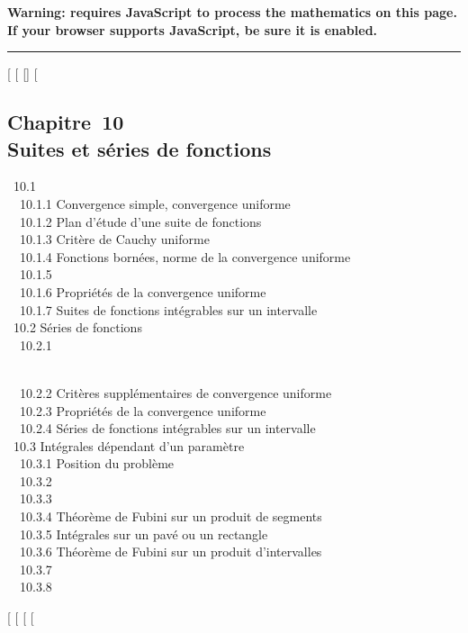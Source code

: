 \textbf{Warning: 
requires JavaScript to process the mathematics on this page.\\ If your
browser supports JavaScript, be sure it is enabled.}

\begin{center}\rule{3in}{0.4pt}\end{center}

{[}
{[}
{[}{]}
{[}

\subsection{Chapitre~10\\Suites et séries de fonctions}

~10.1  \\
~~10.1.1 {Convergence simple,
convergence uniforme} \\ ~~10.1.2
{Plan d'étude d'une suite de
fonctions} \\ ~~10.1.3 {Critère
de Cauchy uniforme} \\ ~~10.1.4
{Fonctions bornées, norme de la
convergence uniforme} \\ ~~10.1.5
 \\
~~10.1.6 {Propriétés de la
convergence uniforme} \\ ~~10.1.7
{Suites de fonctions intégrables
sur un intervalle} \\ ~10.2 {Séries
de fonctions} \\ ~~10.2.1

\\ ~~10.2.2 {Critères
supplémentaires de convergence uniforme} \\ ~~10.2.3
{Propriétés de la convergence
uniforme} \\ ~~10.2.4 {Séries de
fonctions intégrables sur un intervalle} \\ ~10.3
{Intégrales dépendant d'un
paramètre} \\ ~~10.3.1 {Position
du problème} \\ ~~10.3.2
 \\ ~~10.3.3
 \\ ~~10.3.4
{Théorème de Fubini sur un
produit de segments} \\ ~~10.3.5
{Intégrales sur un pavé ou un
rectangle} \\ ~~10.3.6 {Théorème
de Fubini sur un produit d'intervalles} \\ ~~10.3.7
 \\ ~~10.3.8


{[}
{[}
{[}
{[}
